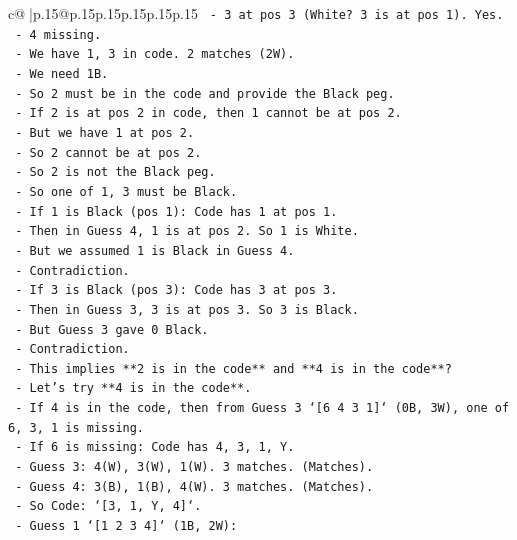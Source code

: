\documentclass{article}
\begin{document}
{\begin{supertabular}{c@{$\;$}|p{.15\linewidth}@{}p{.15\linewidth}p{.15\linewidth}p{.15\linewidth}p{.15\linewidth}p{.15\linewidth}}
{{{\texttt{        {-} 3 at pos 3 (White? 3 is at pos 1). Yes.} \\
\texttt{        {-} 4 missing.} \\
\texttt{        {-} We have 1, 3 in code. 2 matches (2W).} \\
\texttt{        {-} We need 1B.} \\
\texttt{        {-} So 2 must be in the code and provide the Black peg.} \\
\texttt{        {-} If 2 is at pos 2 in code, then 1 cannot be at pos 2.} \\
\texttt{        {-} But we have 1 at pos 2.} \\
\texttt{        {-} So 2 cannot be at pos 2.} \\
\texttt{        {-} So 2 is not the Black peg.} \\
\texttt{        {-} So one of 1, 3 must be Black.} \\
\texttt{        {-} If 1 is Black (pos 1): Code has 1 at pos 1.} \\
\texttt{          {-} Then in Guess 4, 1 is at pos 2. So 1 is White.} \\
\texttt{          {-} But we assumed 1 is Black in Guess 4.} \\
\texttt{          {-} Contradiction.} \\
\texttt{        {-} If 3 is Black (pos 3): Code has 3 at pos 3.} \\
\texttt{          {-} Then in Guess 3, 3 is at pos 3. So 3 is Black.} \\
\texttt{          {-} But Guess 3 gave 0 Black.} \\
\texttt{          {-} Contradiction.} \\
\texttt{    {-} This implies **2 is in the code** and **4 is in the code**?} \\
\texttt{    {-} Let's try **4 is in the code**.} \\
\texttt{    {-} If 4 is in the code, then from Guess 3 `{[}6 4 3 1{]}` (0B, 3W), one of 6, 3, 1 is missing.} \\
\texttt{    {-} If 6 is missing: Code has 4, 3, 1, Y.} \\
\texttt{      {-} Guess 3: 4(W), 3(W), 1(W). 3 matches. (Matches).} \\
\texttt{      {-} Guess 4: 3(B), 1(B), 4(W). 3 matches. (Matches).} \\
\texttt{      {-} So Code: `{[}3, 1, Y, 4{]}`.} \\
\texttt{      {-} Guess 1 `{[}1 2 3 4{]}` (1B, 2W):} \\
}}}
\end{supertabular}}
\end{document}
